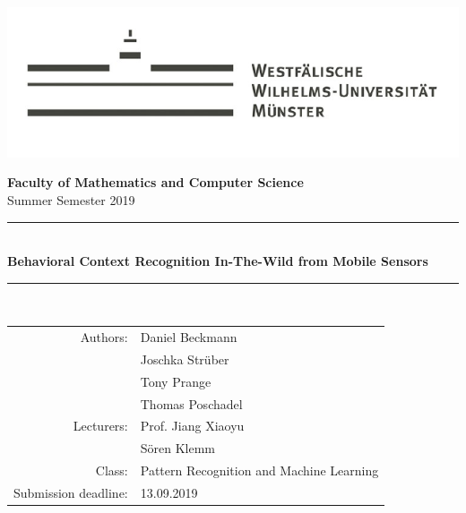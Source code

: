 \documentclass[a4paper,12pt]{scrartcl}
\begin{document}
	
	
\begin{singlespace}
\begin{titlepage}
	\begin{center}
		
		\includegraphics[scale=0.6]{wwu}
		
		\large{\textbf{\textsf{Faculty of Mathematics and Computer Science}}\\ 
			Summer Semester 2019} \\
		\vspace{20mm}
        \rule{.8\linewidth}{1pt}\\
        \vspace{3mm}
		\LARGE\textbf{\textsf{Behavioral Context Recognition In-The-Wild from Mobile Sensors}}\\
		\rule{.8\linewidth}{1pt}\\

		\vfill
	\end{center}
\begin{flushright}
	\flushright

		\begin{large}
	\singlespacing 		
		\begin{tabular}{rl}

			Authors: & Daniel Beckmann \\ & Joschka Strüber \\& Tony Prange \\& Thomas Poschadel \\
			 \midrule
			Lecturers: & Prof. Jiang Xiaoyu \\
					& Sören Klemm \\
			Class:& Pattern Recognition and Machine Learning \\
			Submission deadline: & 13.09.2019

		\end{tabular}
		\end{large}	
\end{flushright}
	

\end{titlepage}
\end{singlespace}
\end{document}
